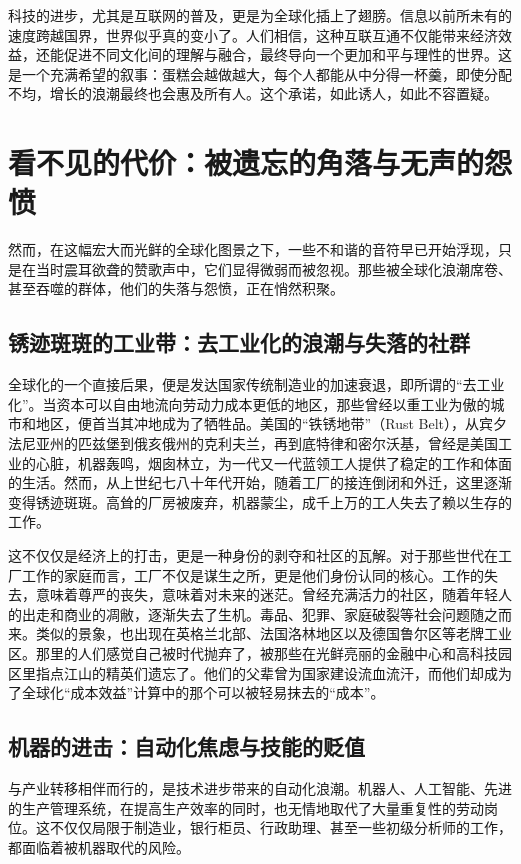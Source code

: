 科技的进步，尤其是互联网的普及，更是为全球化插上了翅膀。信息以前所未有的速度跨越国界，世界似乎真的变小了。人们相信，这种互联互通不仅能带来经济效益，还能促进不同文化间的理解与融合，最终导向一个更加和平与理性的世界。这是一个充满希望的叙事：蛋糕会越做越大，每个人都能从中分得一杯羹，即使分配不均，增长的浪潮最终也会惠及所有人。这个承诺，如此诱人，如此不容置疑。

\section{看不见的代价：被遗忘的角落与无声的怨愤}

然而，在这幅宏大而光鲜的全球化图景之下，一些不和谐的音符早已开始浮现，只是在当时震耳欲聋的赞歌声中，它们显得微弱而被忽视。那些被全球化浪潮席卷、甚至吞噬的群体，他们的失落与怨愤，正在悄然积聚。

\subsection{锈迹斑斑的工业带：去工业化的浪潮与失落的社群}

全球化的一个直接后果，便是发达国家传统制造业的加速衰退，即所谓的“去工业化”。当资本可以自由地流向劳动力成本更低的地区，那些曾经以重工业为傲的城市和地区，便首当其冲地成为了牺牲品。美国的“铁锈地带”（Rust Belt），从宾夕法尼亚州的匹兹堡到俄亥俄州的克利夫兰，再到底特律和密尔沃基，曾经是美国工业的心脏，机器轰鸣，烟囱林立，为一代又一代蓝领工人提供了稳定的工作和体面的生活。然而，从上世纪七八十年代开始，随着工厂的接连倒闭和外迁，这里逐渐变得锈迹斑斑。高耸的厂房被废弃，机器蒙尘，成千上万的工人失去了赖以生存的工作。

这不仅仅是经济上的打击，更是一种身份的剥夺和社区的瓦解。对于那些世代在工厂工作的家庭而言，工厂不仅是谋生之所，更是他们身份认同的核心。工作的失去，意味着尊严的丧失，意味着对未来的迷茫。曾经充满活力的社区，随着年轻人的出走和商业的凋敝，逐渐失去了生机。毒品、犯罪、家庭破裂等社会问题随之而来。类似的景象，也出现在英格兰北部、法国洛林地区以及德国鲁尔区等老牌工业区。那里的人们感觉自己被时代抛弃了，被那些在光鲜亮丽的金融中心和高科技园区里指点江山的精英们遗忘了。他们的父辈曾为国家建设流血流汗，而他们却成为了全球化“成本效益”计算中的那个可以被轻易抹去的“成本”。

\subsection{机器的进击：自动化焦虑与技能的贬值}

与产业转移相伴而行的，是技术进步带来的自动化浪潮。机器人、人工智能、先进的生产管理系统，在提高生产效率的同时，也无情地取代了大量重复性的劳动岗位。这不仅仅局限于制造业，银行柜员、行政助理、甚至一些初级分析师的工作，都面临着被机器取代的风险。


